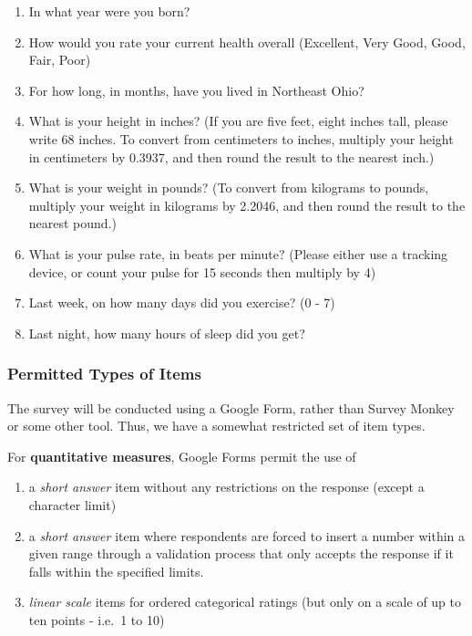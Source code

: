 \documentclass[]{book}
\providecommand{\tightlist}{%
  \setlength{\itemsep}{0pt}\setlength{\parskip}{0pt}}
\theoremstyle{definition}
\theoremstyle{definition}
\theoremstyle{definition}
\theoremstyle{remark}
\begin{document}
\begin{enumerate}
\def\labelenumi{\arabic{enumi}.}
\setcounter{enumi}{7}
\tightlist
\item
  In what year were you born?
\item
  How would you rate your current health overall (Excellent, Very Good,
  Good, Fair, Poor)
\item
  For how long, in months, have you lived in Northeast Ohio?
\item
  What is your height in inches? (If you are five feet, eight inches
  tall, please write 68 inches. To convert from centimeters to inches,
  multiply your height in centimeters by 0.3937, and then round the
  result to the nearest inch.)
\item
  What is your weight in pounds? (To convert from kilograms to pounds,
  multiply your weight in kilograms by 2.2046, and then round the result
  to the nearest pound.)
\item
  What is your pulse rate, in beats per minute? (Please either use a
  tracking device, or count your pulse for 15 seconds then multiply by
  4)
\item
  Last week, on how many days did you exercise? (0 - 7)
\item
  Last night, how many hours of sleep did you get?
\end{enumerate}

\hypertarget{permitted-types-of-items}{%
\subsubsection{Permitted Types of
Items}\label{permitted-types-of-items}}

The survey will be conducted using a Google Form, rather than Survey
Monkey or some other tool. Thus, we have a somewhat restricted set of
item types.

For \textbf{quantitative measures}, Google Forms permit the use of

\begin{enumerate}
\def\labelenumi{\arabic{enumi}.}
\tightlist
\item
  a \emph{short answer} item without any restrictions on the response
  (except a character limit)
\item
  a \emph{short answer} item where respondents are forced to insert a
  number within a given range through a validation process that only
  accepts the response if it falls within the specified limits.
\item
  \emph{linear scale} items for ordered categorical ratings (but only on
  a scale of up to ten points - i.e.~1 to 10)
\end{enumerate}
\end{document}
